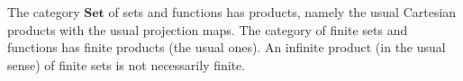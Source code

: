 The category $\mathbf{Set}$ of sets and functions has products, namely the usual Cartesian products with the usual projection maps. The category of finite sets and functions has finite products (the usual ones). An infinite product (in the usual sense) of finite sets is not necessarily finite.
